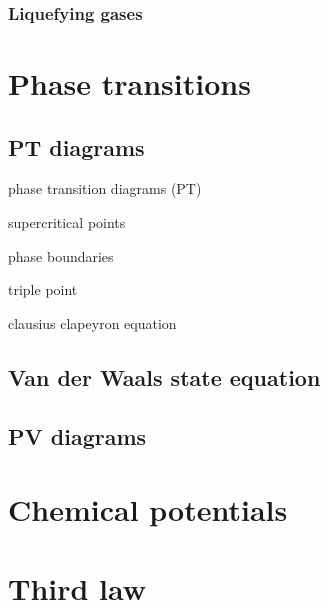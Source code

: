 \documentclass{article}
\begin{document}
\subsubsection{Liquefying gases}

\newpage

\section{Phase transitions}

\subsection{PT diagrams}
phase transition diagrams (PT)

supercritical points

phase boundaries

triple point

clausius clapeyron equation

\subsection{Van der Waals state equation}

\subsection{PV diagrams}

\newpage

\section{Chemical potentials}

\newpage

\section{Third law}
\end{document}
